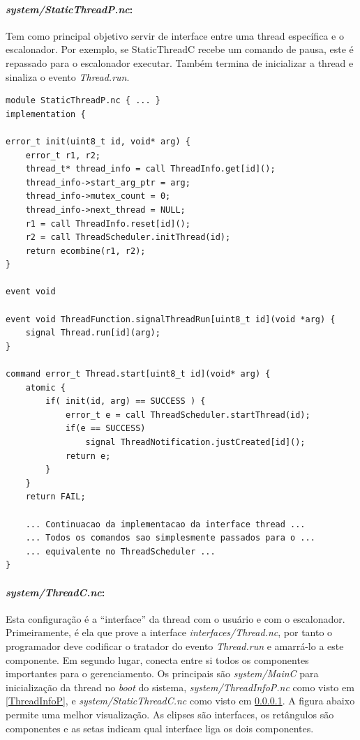 \documentclass[a4paper, 10pt]{article}
\begin{document}
\paragraph{\textit{system/StaticThreadP.nc}:}\label{StaticThreadC}
Tem como principal objetivo servir de interface entre uma thread específica e o escalonador. Por exemplo, se
StaticThreadC recebe um comando de pausa, este é repassado para o escalonador executar. Também termina de inicializar a
thread e sinaliza o evento \textit{Thread.run}.
\begin{lstlisting}
module StaticThreadP.nc { ... }
implementation {

error_t init(uint8_t id, void* arg) {                                   
    error_t r1, r2;                                                       
    thread_t* thread_info = call ThreadInfo.get[id]();                    
    thread_info->start_arg_ptr = arg;                                     
    thread_info->mutex_count = 0;                                         
    thread_info->next_thread = NULL;                                      
    r1 = call ThreadInfo.reset[id]();                                     
    r2 = call ThreadScheduler.initThread(id);                             
    return ecombine(r1, r2);                                              
}  

event void 

event void ThreadFunction.signalThreadRun[uint8_t id](void *arg) {
    signal Thread.run[id](arg);
}

command error_t Thread.start[uint8_t id](void* arg) {
    atomic {
        if( init(id, arg) == SUCCESS ) {
            error_t e = call ThreadScheduler.startThread(id);
            if(e == SUCCESS)
                signal ThreadNotification.justCreated[id]();
            return e;
        }
    }
    return FAIL;

    ... Continuacao da implementacao da interface thread ...
    ... Todos os comandos sao simplesmente passados para o ...
    ... equivalente no ThreadScheduler ...
}

\end{lstlisting}

\paragraph{\textit{system/ThreadC.nc}:}
Esta configuração é a ``interface'' da thread com o usuário e com o escalonador. Primeiramente, é ela que prove a 
interface \textit{interfaces/Thread.nc}, por tanto o programador deve codificar o tratador do evento 
\textit{Thread.run} e amarrá-lo a este componente. Em segundo lugar, conecta entre si todos os componentes 
importantes para o gerenciamento. Os principais são \textit{system/MainC} para inicialização da thread no \textit{boot} do sistema,
 \textit{system/ThreadInfoP.nc} como visto em \ref{ThreadInfoP}, e \textit{system/StaticThreadC.nc} como visto em
\ref{StaticThreadC}. A figura abaixo permite uma melhor visualização. As elipses são interfaces, os retângulos são
componentes e as setas indicam qual interface liga os dois componentes.
\end{document}
